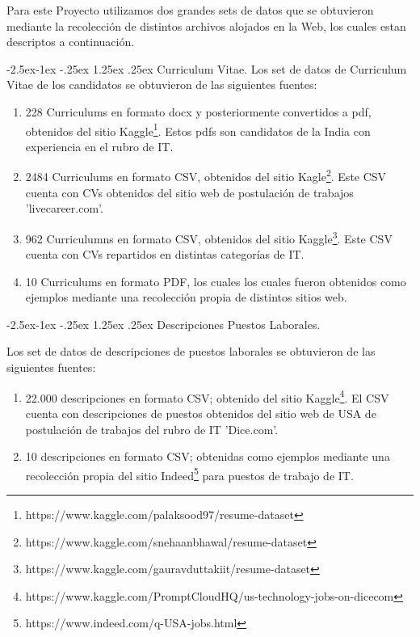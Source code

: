 \documentclass[12pt,a4paper]{article}
\makeatletter
\renewcommand\paragraph{\@startsection{paragraph}{4}{\z@}
            {-2.5ex\@plus -1ex \@minus -.25ex}
            {1.25ex \@plus .25ex}
            {\normalfont\normalsize\bfseries}}
\makeatother
\begin{document}
Para este Proyecto utilizamos dos grandes sets de datos que se obtuvieron mediante la recolección de distintos archivos alojados en la Web, los cuales estan descriptos a continuación.

\paragraph{Curriculum Vitae.}
Los set de datos de Curriculum Vitae de los candidatos se obtuvieron de las siguientes fuentes:

\begin{enumerate}
\item 228 Curriculums en formato docx y posteriormente convertidos a pdf, obtenidos del sitio Kaggle\footnote{https://www.kaggle.com/palaksood97/resume-dataset}. Estos pdfs son candidatos de la India con experiencia en el rubro de IT.
\item 2484 Curriculums en formato CSV, obtenidos del sitio Kagle\footnote{https://www.kaggle.com/snehaanbhawal/resume-dataset}. Este CSV cuenta con CVs obtenidos del sitio web de postulación de trabajos 'livecareer.com'.
\item 962 Curriculumns en formato CSV, obtenidos del sitio Kaggle\footnote{https://www.kaggle.com/gauravduttakiit/resume-dataset}. Este CSV cuenta con CVs repartidos en distintas categorías de IT.
\item 10 Curriculums en formato PDF, los cuales los cuales fueron obtenidos como ejemplos mediante una recolección propia de distintos sitios web. 
\end{enumerate}

\paragraph{Descripciones Puestos Laborales.}

Los set de datos de descripciones de puestos laborales se obtuvieron de las siguientes fuentes:

\begin{enumerate}
\item 22.000 descripciones en formato CSV; obtenido del sitio Kaggle\footnote{https://www.kaggle.com/PromptCloudHQ/us-technology-jobs-on-dicecom}. El CSV cuenta con descripciones de puestos obtenidos del sitio web de USA de postulación de trabajos del rubro de IT 'Dice.com'.
\item 10 descripciones en formato CSV; obtenidas como ejemplos mediante una recolección propia del sitio Indeed\footnote{https://www.indeed.com/q-USA-jobs.html} para puestos de trabajo de IT.
\end{enumerate}
\end{document}
